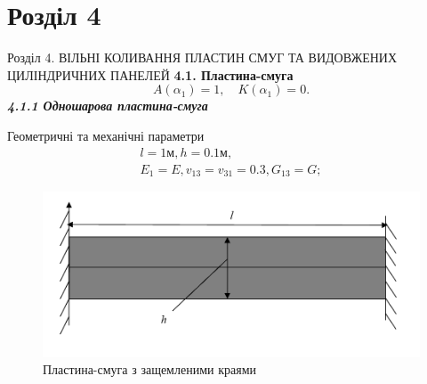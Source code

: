 \documentclass[8pt]{beamer}
\numberwithin{figure}{section}
\numberwithin{equation}{section}
\numberwithin{table}{section}
\begin{document}
\section{Розділ 4}
\begin{frame}{Розділ 4. ВІЛЬНІ КОЛИВАННЯ ПЛАСТИН СМУГ ТА ВИДОВЖЕНИХ ЦИЛІНДРИЧНИХ ПАНЕЛЕЙ}
\textbf{4.1. Пластина-смуга}
\begin{equation}
A\left( \alpha_1 \right)=1, \quad K\left( \alpha_1 \right)=0.
\end{equation}
\textbf{\textit{4.1.1 Одношарова пластина-смуга}}
\vspace{1em}

Геометричні та механічні  параметри
\begin{equation}
\begin{gathered}
l=1\text{м}, h=0.1\text{м},\\
E_1=E, v_{13}=v_{31}=0.3, G_{13}=G;
\end{gathered}
\end{equation}
\begin{figure}
	\includegraphics[scale=0.3]{pic/plate.png}
		\caption{Пластина-смуга з защемленими краями}
		\label{fig:plate}
\end{figure}



\end{frame}
\end{document}

